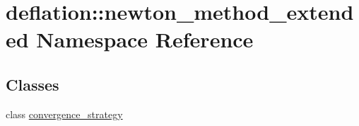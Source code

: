 \hypertarget{namespacedeflation_1_1newton__method__extended}{\section{deflation\-:\-:newton\-\_\-method\-\_\-extended Namespace Reference}
\label{namespacedeflation_1_1newton__method__extended}
}
\subsection*{Classes}
\begin{DoxyCompactItemize}
\item 
class \hyperlink{classdeflation_1_1newton__method__extended_1_1convergence__strategy}{convergence\-\_\-strategy}
\end{DoxyCompactItemize}
